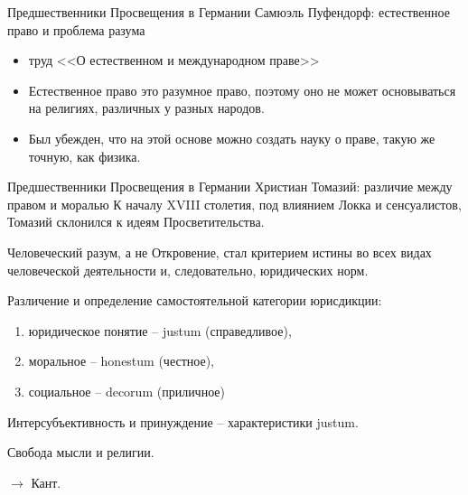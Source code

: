 \documentclass{beamer}
\begin{document}
    \begin{frame}{Предшественники Просвещения в Германии}
            {Самюэль Пуфендорф: естественное право и проблема разума}
        \begin{itemize}
        \item труд <<О естественном и международном праве>>
        \item Естественное право это разумное право, поэтому оно не может
            основываться на религиях, различных у разных народов.
        \item Был убежден, что на этой основе можно создать науку о праве,
            такую же точную, как физика.
        \end{itemize}
    \end{frame}

    \begin{frame}{Предшественники Просвещения в Германии}
            {Христиан Томазий: различие между правом и моралью}
        К началу XVIII столетия, под влиянием Локка и сенсуалистов,
        Томазий склонился к идеям Просветительства.

        Человеческий разум, а не Откровение, стал критерием истины во всех
        видах человеческой деятельности и, следовательно, юридических норм.

        Различение и определение самостоятельной категории юрисдикции:
        \begin{enumerate}
        \item юридическое понятие -- justum (справедливое),
        \item моральное -- honestum (честное),
        \item социальное -- decorum (приличное)
        \end{enumerate}
        Интерсубъективность и принуждение -- характеристики justum.

        Свобода мысли и религии.

        $\rightarrow$ Кант.
    \end{frame}
\end{document}
